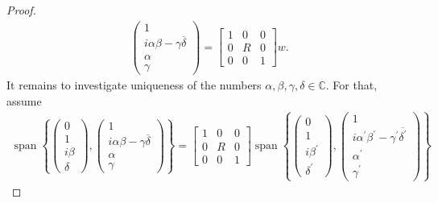 \documentclass[10pt,a4paper]{amsart}
\newcommand{\C}{\mathbb{C}}
\DeclareMathOperator{\spann}{span}
\begin{document}
\begin{proof}
    \begin{align*}
        \begin{pmatrix}
                1 \\ i \alpha \beta - \gamma \overline{\delta} \\ \alpha \\ \gamma
            \end{pmatrix}
        =
        \left[\begin{array}{c|c|c}
            1& 0 & 0 \\
            \hline
            0 & R & 0 \\
            \hline 
            0 & 0 & 1
            \end{array}\right]
            w.
    \end{align*}
    It remains to investigate uniqueness of the numbers $\alpha, \beta, \gamma, \delta \in \C$. 
    For that, assume
    \begin{align*}
        \spann \left\{ \begin{pmatrix}
            0 \\ 1 \\ i \beta \\ \delta
        \end{pmatrix}, \begin{pmatrix}
            1 \\ i \alpha \beta - \gamma \overline{\delta} \\ \alpha \\ \gamma
        \end{pmatrix} \right\}
        = 
        \left[\begin{array}{c|c|c}
            1& 0 & 0 \\
            \hline
            0 & R & 0 \\
            \hline 
            0 & 0 & 1
            \end{array}\right]
            \spann \left\{ \begin{pmatrix}
                0 \\ 1 \\ i \beta^\prime \\ \delta^\prime
            \end{pmatrix}, \begin{pmatrix}
                1 \\ i \alpha^\prime \beta^\prime - \gamma^\prime \overline{\delta^\prime} \\ \alpha^\prime \\ \gamma^\prime
            \end{pmatrix} \right\}

\end{align*}
\end{proof}
\end{document}

